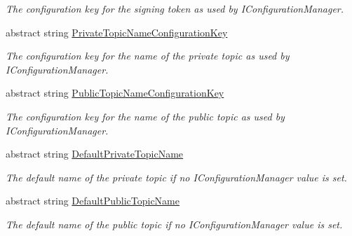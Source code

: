\begin{DoxyCompactItemize}
\begin{DoxyCompactList}\small\item\em The configuration key for the signing token as used by I\+Configuration\+Manager. \end{DoxyCompactList}\item 
abstract string \hyperlink{classCqrs_1_1Azure_1_1ServiceBus_1_1AzureServiceBus_ad24cd58549bbf6377e692b6ae6843be9_ad24cd58549bbf6377e692b6ae6843be9}{Private\+Topic\+Name\+Configuration\+Key}
\begin{DoxyCompactList}\small\item\em The configuration key for the name of the private topic as used by I\+Configuration\+Manager. \end{DoxyCompactList}\item 
abstract string \hyperlink{classCqrs_1_1Azure_1_1ServiceBus_1_1AzureServiceBus_aec01ea2e2fb686bb3c9ff04f4d337ed6_aec01ea2e2fb686bb3c9ff04f4d337ed6}{Public\+Topic\+Name\+Configuration\+Key}
\begin{DoxyCompactList}\small\item\em The configuration key for the name of the public topic as used by I\+Configuration\+Manager. \end{DoxyCompactList}\item 
abstract string \hyperlink{classCqrs_1_1Azure_1_1ServiceBus_1_1AzureServiceBus_a1fb185ed8605b1f985e4c108ff906b93_a1fb185ed8605b1f985e4c108ff906b93}{Default\+Private\+Topic\+Name}
\begin{DoxyCompactList}\small\item\em The default name of the private topic if no I\+Configuration\+Manager value is set. \end{DoxyCompactList}\item 
abstract string \hyperlink{classCqrs_1_1Azure_1_1ServiceBus_1_1AzureServiceBus_a1119f77ee8c51a575217466046f282a9_a1119f77ee8c51a575217466046f282a9}{Default\+Public\+Topic\+Name}
\begin{DoxyCompactList}\small\item\em The default name of the public topic if no I\+Configuration\+Manager value is set. \end{DoxyCompactList}\item 

\end{DoxyCompactItemize}
